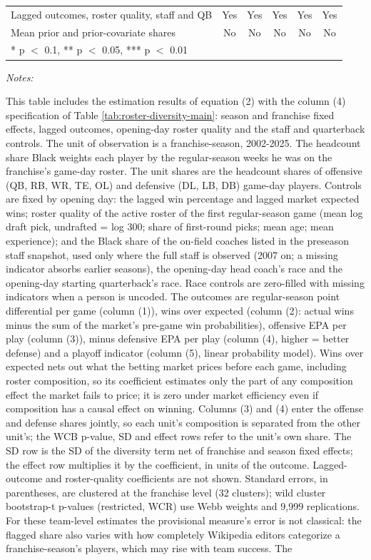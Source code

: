 \begin{table}[!h]
{\begin{threeparttable}
\begin{tabular}[t]{lccccc}
Lagged outcomes, roster quality, staff and QB & Yes & Yes & Yes & Yes & Yes\\
Mean prior and prior-covariate shares & No & No & No & No & No\\
\bottomrule
\multicolumn{6}{l}{\rule{0pt}{1em}* p $<$ 0.1, ** p $<$ 0.05, *** p $<$ 0.01}\\
\end{tabular}
\begin{tablenotes}[para]
\item \textit{Notes:} 
\item This table includes the estimation results of equation (2) with the column (4) specification of Table \ref{tab:roster-diversity-main}: season and franchise fixed effects, lagged outcomes, opening-day roster quality and the staff and quarterback controls. The unit of observation is a franchise-season, 2002-2025. The headcount share Black weights each player by the regular-season weeks he was on the franchise's game-day roster. The unit shares are the headcount shares of offensive (QB, RB, WR, TE, OL) and defensive (DL, LB, DB) game-day players. Controls are fixed by opening day: the lagged win percentage and lagged market expected wins; roster quality of the active roster of the first regular-season game (mean log draft pick, undrafted = log 300; share of first-round picks; mean age; mean experience); and the Black share of the on-field coaches listed in the preseason staff snapshot, used only where the full staff is observed (2007 on; a missing indicator absorbs earlier seasons), the opening-day head coach's race and the opening-day starting quarterback's race. Race controls are zero-filled with missing indicators when a person is uncoded. The outcomes are regular-season point differential per game (column (1)), wins over expected (column (2): actual wins minus the sum of the market's pre-game win probabilities), offensive EPA per play (column (3)), minus defensive EPA per play (column (4), higher = better defense) and a playoff indicator (column (5), linear probability model). Wins over expected nets out what the betting market prices before each game, including roster composition, so its coefficient estimates only the part of any composition effect the market fails to price; it is zero under market efficiency even if composition has a causal effect on winning. Columns (3) and (4) enter the offense and defense shares jointly, so each unit's composition is separated from the other unit's; the WCB p-value, SD and effect rows refer to the unit's own share. The SD row is the SD of the diversity term net of franchise and season fixed effects; the effect row multiplies it by the coefficient, in units of the outcome. Lagged-outcome and roster-quality coefficients are not shown. Standard errors, in parentheses, are clustered at the franchise level (32 clusters); wild cluster bootstrap-t p-values (restricted, WCR) use Webb weights and 9,999 replications. For these team-level estimates the provisional measure's error is not classical: the flagged share also varies with how completely Wikipedia editors categorize a franchise-season's players, which may rise with team success. The 
\end{tablenotes}
\end{threeparttable}}
\end{table}
